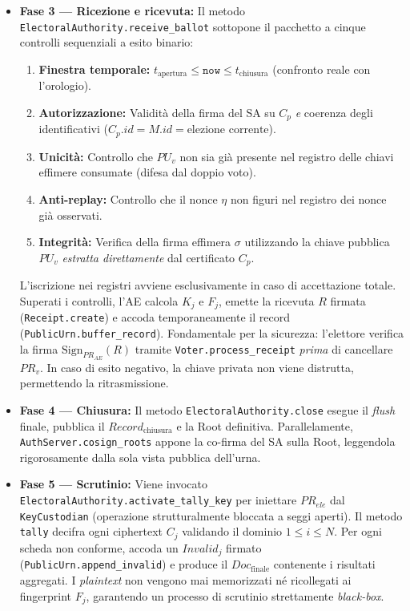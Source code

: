 \begin{itemize}
  \item \textbf{Fase 3 --- Ricezione e ricevuta:} Il metodo \texttt{ElectoralAuthority.receive\_ballot} sottopone il pacchetto a cinque controlli sequenziali a esito binario:
  \begin{enumerate}
    \item \textbf{Finestra temporale:} $t_{\text{apertura}} \le \texttt{now} \le t_{\text{chiusura}}$ (confronto reale con l'orologio).
    \item \textbf{Autorizzazione:} Validità della firma del SA su $C_p$ \emph{e} coerenza degli identificativi ($C_p.id = M.id = \text{elezione corrente}$).
    \item \textbf{Unicità:} Controllo che $PU_v$ non sia già presente nel registro delle chiavi effimere consumate (difesa dal doppio voto).
    \item \textbf{Anti-replay:} Controllo che il nonce $\eta$ non figuri nel registro dei nonce già osservati.
    \item \textbf{Integrità:} Verifica della firma effimera $\sigma$ utilizzando la chiave pubblica $PU_v$ \emph{estratta direttamente} dal certificato $C_p$.
  \end{enumerate}
  L'iscrizione nei registri avviene esclusivamente in caso di accettazione totale. Superati i controlli, l'AE calcola $K_j$ e $F_j$, emette la ricevuta $R$ firmata (\texttt{Receipt.create}) e accoda temporaneamente il record (\texttt{PublicUrn.buffer\_record}). Fondamentale per la sicurezza: l'elettore verifica la firma $\mathrm{Sign}_{PR_{AE}}(R)$ tramite \texttt{Voter.process\_receipt} \emph{prima} di cancellare $PR_v$. In caso di esito negativo, la chiave privata non viene distrutta, permettendo la ritrasmissione.

  \item \textbf{Fase 4 --- Chiusura:} Il metodo \texttt{ElectoralAuthority.close} esegue il \emph{flush} finale, pubblica il $\mathit{Record}_{\text{chiusura}}$ e la Root definitiva. Parallelamente, \texttt{AuthServer.cosign\_roots} appone la co-firma del SA sulla Root, leggendola rigorosamente dalla sola vista pubblica dell'urna.

  \item \textbf{Fase 5 --- Scrutinio:} Viene invocato \texttt{ElectoralAuthority.activate\_tally\_key} per iniettare $PR_{ele}$ dal \texttt{KeyCustodian} (operazione strutturalmente bloccata a seggi aperti). Il metodo \texttt{tally} decifra ogni ciphertext $C_j$ validando il dominio $1 \le i \le N$. Per ogni scheda non conforme, accoda un $\mathit{Invalid}_j$ firmato (\texttt{PublicUrn.append\_invalid}) e produce il $\mathit{Doc}_{\text{finale}}$ contenente i risultati aggregati. I \emph{plaintext} non vengono mai memorizzati né ricollegati ai fingerprint $F_j$, garantendo un processo di scrutinio strettamente \emph{black-box}.
\end{itemize}

